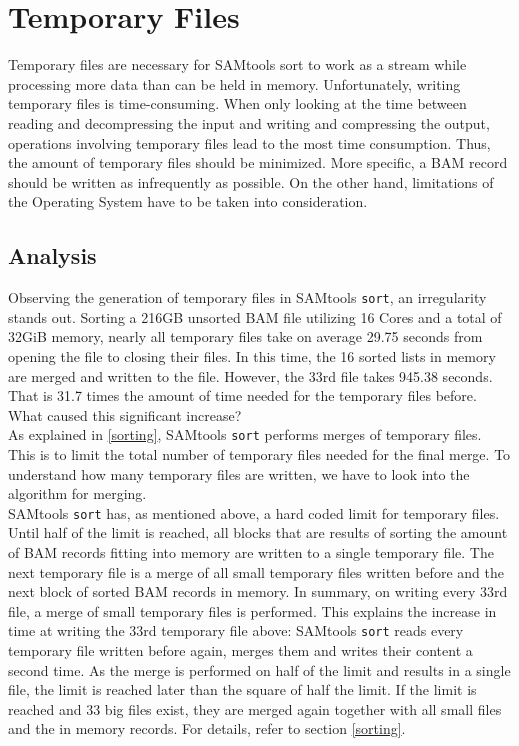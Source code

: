 \section{Temporary Files} 

Temporary files are necessary for SAMtools sort to work as a stream while processing more data than can be held in memory. Unfortunately, writing temporary files is time-consuming. When only looking at the time between reading and decompressing the input and writing and compressing the output, operations involving temporary files lead to the most time consumption. Thus, the amount of temporary files should be minimized. More specific, a BAM record should be written as infrequently as possible. On the other hand, limitations of the Operating System have to be taken into consideration.

\subsection{Analysis}
Observing the generation of temporary files in SAMtools \texttt{sort}, an irregularity stands out. Sorting a 216GB unsorted BAM file utilizing 16 Cores and a total of 32GiB memory, nearly all temporary files take on average 29.75 seconds from opening the file to closing their files. In this time, the 16 sorted lists in memory are merged and written to the file. However, the 33rd file takes 945.38 seconds. That is 31.7 times the amount of time needed for the temporary files before. What caused this significant increase? \\
As explained in \ref{sorting}, SAMtools \texttt{sort} performs merges of temporary files. This is to limit the total number of temporary files needed for the final merge.
To understand how many temporary files are written, we have to look into the algorithm for merging. \\
SAMtools \texttt{sort} has, as mentioned above, a hard coded limit for temporary files. Until half of the limit is reached, all blocks that are results of sorting the amount of BAM records fitting into memory are written to a single temporary file. The next temporary file is a merge of all small temporary files written before and the next block of sorted BAM records in memory. In summary, on writing every 33rd file, a merge of small temporary files is performed. This explains the increase in time at writing the 33rd temporary file above: SAMtools \texttt{sort} reads every temporary file written before again, merges them and writes their content a second time. As the merge is performed on half of the limit and results in a single file, the limit is reached later than the square of half the limit. If the limit is reached and 33 big files exist, they are merged again together with all small files and the in memory records. For details, refer to section \ref{sorting}. \\
